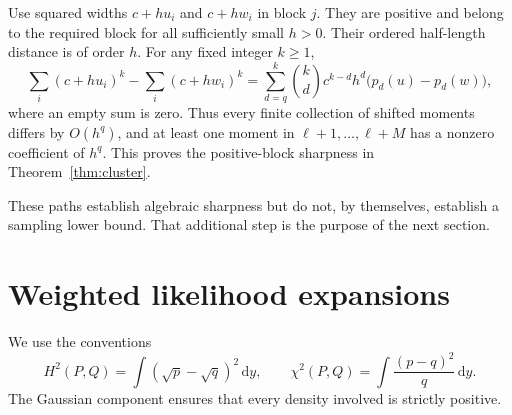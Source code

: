 \documentclass[11pt,a4paper]{article}
\numberwithin{equation}{section}
\theoremstyle{definition}
\theoremstyle{remark}
\newcommand{\dd}{\,\mathrm d}
\begin{document}
Use squared widths $c+hu_i$ and $c+hw_i$ in block $j$. They are positive and
belong to the required block for all sufficiently small $h>0$. Their ordered
half-length distance is of order $h$. For any fixed integer $k\ge1$,
\begin{equation}
 \sum_i(c+hu_i)^k-\sum_i(c+hw_i)^k
   =\sum_{d=q}^k \binom{k}{d}c^{k-d}h^d\bigl(p_d(u)-p_d(w)\bigr),
 \label{eq:binomialcancel}
\end{equation}
where an empty sum is zero. Thus every finite collection of shifted moments
differs by $O(h^q)$, and at least one moment in
$\ell+1,\ldots,\ell+M$ has a nonzero coefficient of $h^q$.
This proves the positive-block sharpness in Theorem~\ref{thm:cluster}.

These paths establish algebraic sharpness but do not, by themselves,
establish a sampling lower bound. That additional step is the purpose of
the next section.

\section{Weighted likelihood expansions}
\label{sec:likelihood}

We use the conventions
\begin{equation}
 H^2(P,Q)=\int(\sqrt p-\sqrt q)^2\dd y,\qquad
 \chi^2(P,Q)=\int\frac{(p-q)^2}{q}\dd y.
 \label{eq:divergences}
\end{equation}
The Gaussian component ensures that every density involved is strictly
positive.
\end{document}
